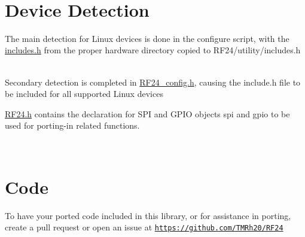 ~\newline
 \hypertarget{Portability_Device_Detection}{}\section{Device Detection}\label{Portability_Device_Detection}

\begin{DoxyEnumerate}
\item The main detection for Linux devices is done in the configure script, with the \hyperlink{includes_8h}{includes.\+h} from the proper hardware directory copied to R\+F24/utility/includes.\+h ~\newline

\item Secondary detection is completed in \hyperlink{RF24__config_8h}{R\+F24\+\_\+config.\+h}, causing the include.\+h file to be included for all supported Linux devices ~\newline

\item \hyperlink{RF24_8h}{R\+F24.\+h} contains the declaration for S\+PI and G\+P\+IO objects \textquotesingle{}spi\textquotesingle{} and \textquotesingle{}gpio\textquotesingle{} to be used for porting-\/in related functions.
\end{DoxyEnumerate}

~\newline
 \hypertarget{Portability_Ported_Code}{}\section{Code}\label{Portability_Ported_Code}
To have your ported code included in this library, or for assistance in porting, create a pull request or open an issue at \href{https://github.com/TMRh20/RF24}{\tt https\+://github.\+com/\+T\+M\+Rh20/\+R\+F24}

~\newline
~\newline
~\newline
 